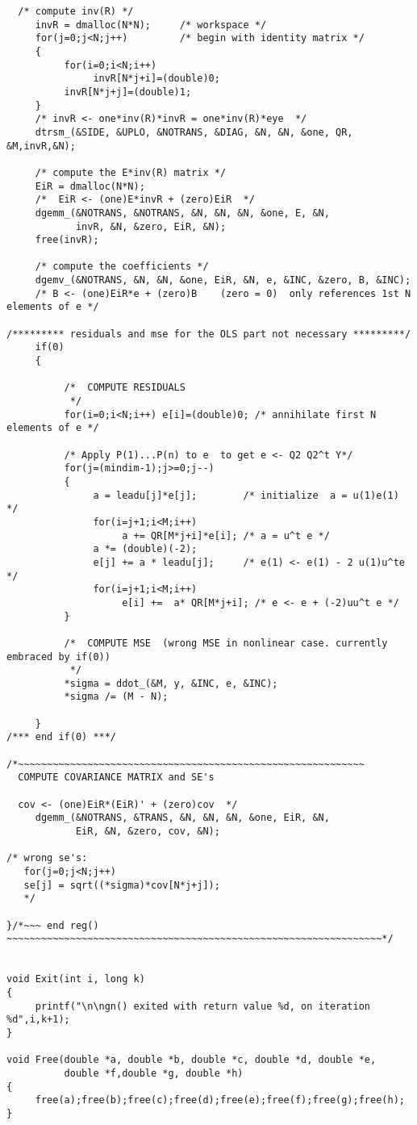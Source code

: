\documentclass{article}
\begin{document}
{\begin{verbatim}
  /* compute inv(R) */
     invR = dmalloc(N*N);     /* workspace */
     for(j=0;j<N;j++)         /* begin with identity matrix */
     {
          for(i=0;i<N;i++)
               invR[N*j+i]=(double)0;
          invR[N*j+j]=(double)1;
     }
     /* invR <- one*inv(R)*invR = one*inv(R)*eye  */
     dtrsm_(&SIDE, &UPLO, &NOTRANS, &DIAG, &N, &N, &one, QR, &M,invR,&N);

     /* compute the E*inv(R) matrix */
     EiR = dmalloc(N*N);      
     /*  EiR <- (one)E*invR + (zero)EiR  */
     dgemm_(&NOTRANS, &NOTRANS, &N, &N, &N, &one, E, &N, 
            invR, &N, &zero, EiR, &N); 
     free(invR);

     /* compute the coefficients */
     dgemv_(&NOTRANS, &N, &N, &one, EiR, &N, e, &INC, &zero, B, &INC);
     /* B <- (one)EiR*e + (zero)B    (zero = 0)  only references 1st N elements of e */

/********* residuals and mse for the OLS part not necessary *********/     
     if(0)
     { 

          /*  COMPUTE RESIDUALS
           */
          for(i=0;i<N;i++) e[i]=(double)0; /* annihilate first N elements of e */

          /* Apply P(1)...P(n) to e  to get e <- Q2 Q2^t Y*/
          for(j=(mindim-1);j>=0;j--)
          {
               a = leadu[j]*e[j];        /* initialize  a = u(1)e(1) */
               for(i=j+1;i<M;i++)
                    a += QR[M*j+i]*e[i]; /* a = u^t e */
               a *= (double)(-2);
               e[j] += a * leadu[j];     /* e(1) <- e(1) - 2 u(1)u^te */
               for(i=j+1;i<M;i++)
                    e[i] +=  a* QR[M*j+i]; /* e <- e + (-2)uu^t e */
          }

          /*  COMPUTE MSE  (wrong MSE in nonlinear case. currently embraced by if(0))
           */
          *sigma = ddot_(&M, y, &INC, e, &INC);
          *sigma /= (M - N);

     } 
/*** end if(0) ***/

/*~~~~~~~~~~~~~~~~~~~~~~~~~~~~~~~~~~~~~~~~~~~~~~~~~~~~~~~~~~~~
  COMPUTE COVARIANCE MATRIX and SE's

  cov <- (one)EiR*(EiR)' + (zero)cov  */
     dgemm_(&NOTRANS, &TRANS, &N, &N, &N, &one, EiR, &N, 
            EiR, &N, &zero, cov, &N); 

/* wrong se's:
   for(j=0;j<N;j++)
   se[j] = sqrt((*sigma)*cov[N*j+j]);
   */

}/*~~~ end reg() ~~~~~~~~~~~~~~~~~~~~~~~~~~~~~~~~~~~~~~~~~~~~~~~~~~~~~~~~~~~~~~~~~*/


void Exit(int i, long k)
{
     printf("\n\ngn() exited with return value %d, on iteration %d",i,k+1);
}

void Free(double *a, double *b, double *c, double *d, double *e, 
          double *f,double *g, double *h)
{
     free(a);free(b);free(c);free(d);free(e);free(f);free(g);free(h);
}
\end{verbatim}
}  
\end{document}
